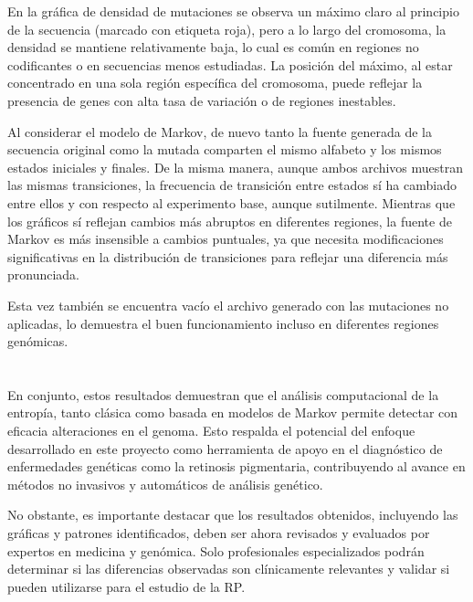 \documentclass[11pt,spanish,listoffigures,listoftables]{tfgetsinf}
\begin{document}
En la gráfica de densidad de mutaciones se observa un máximo claro al principio de la secuencia (marcado con etiqueta roja), pero a lo largo del cromosoma, la densidad se mantiene relativamente baja, lo cual es común en regiones no codificantes o en secuencias menos estudiadas. La posición del máximo, al estar concentrado en una sola región específica del cromosoma, puede reflejar la presencia de genes con alta tasa de variación o de regiones inestables.

Al considerar el modelo de Markov, de nuevo tanto la fuente generada de la secuencia original como la mutada comparten el mismo alfabeto y los mismos estados iniciales y finales. De la misma manera, aunque ambos archivos muestran las mismas transiciones, la frecuencia de transición entre estados sí ha cambiado entre ellos y con respecto al experimento base, aunque sutilmente. Mientras que los gráficos sí reflejan cambios más abruptos en diferentes regiones, la fuente de Markov es más insensible a cambios puntuales, ya que necesita modificaciones significativas en la distribución de transiciones para reflejar una diferencia más pronunciada.

Esta vez también se encuentra vacío el archivo generado con las mutaciones no aplicadas, lo demuestra el buen funcionamiento incluso en diferentes regiones genómicas.\\\\\\

En conjunto, estos resultados demuestran que el análisis computacional de la entropía, tanto clásica como basada en modelos de Markov permite detectar con eficacia alteraciones en el genoma. Esto respalda el potencial del enfoque desarrollado en este proyecto como herramienta de apoyo en el diagnóstico de enfermedades genéticas como la retinosis pigmentaria, contribuyendo al avance en métodos no invasivos y automáticos de análisis genético.

No obstante, es importante destacar que los resultados obtenidos, incluyendo las gráficas y patrones identificados, deben ser ahora revisados y evaluados por expertos en medicina y genómica. Solo profesionales especializados podrán determinar si las diferencias observadas son clínicamente relevantes y validar si pueden utilizarse para el estudio de la \acs{RP}.


\end{document}
